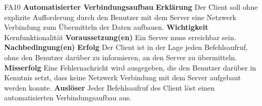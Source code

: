 \documentclass[a4paper,12pt]{article}
\begin{document}
\begin{itemize}[nosep]
\leftskip=0.5cm

\begin{minipage}[t]{\linewidth}
\item[FA10] \textbf{Automatisierter Verbindungsaufbau}
\subitem \textbf{Erklärung} Der \gls{Client} soll ohne explizite Aufforderung durch den \gls{Benutzer} mit dem \gls{Server} eine Netzwerk Verbindung zum Übermitteln der Daten aufbauen.
\subitem \textbf{Wichtigkeit} Kernfunktionalität
\subitem \textbf{Voraussetzung(en)} Ein \gls{Server} muss erreichbar sein.
\subitem \textbf{Nachbedingung(en)}
\subsubitem \textbf{Erfolg} Der \gls{Client} ist in der Lage jeden Befehlsaufruf, ohne den \gls{Benutzer} darüber zu informieren, an den \gls{Server} zu übermitteln.
\subsubitem \textbf{Misserfolg} Eine Fehlernachricht wird ausgegeben, die den \gls{Benutzer} darüber in Kenntnis setzt, dass keine Netzwerk Verbindung mit dem \gls{Server} aufgebaut werden konnte.
\subitem \textbf{Auslöser} Jeder Befehlsaufruf des \gls{Client} löst einen automatisierten Verbindungsaufbau aus.

\end{minipage}
\end{itemize}
\end{document}
